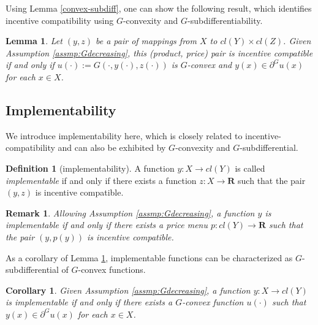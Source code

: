 \documentclass[a4paper, 11pt]{amsart}
\numberwithin{equation}{section}
\theoremstyle{plain}
\newtheorem{corollary}[theorem]{Corollary}
\newtheorem{lemma}[theorem]{Lemma}
\newtheorem{remark}[theorem]{Remark}
\theoremstyle{definition}
\newtheorem{definition}[theorem]{Definition}
\theoremstyle{remark}
\newcommand{\R}{\mathbf{R}}
\begin{document}
Using Lemma \ref{convex-subdiff}, one can show the following result, which identifies incentive compatibility using $G$-convexity and $G$-subdifferentiability.

\begin{lemma}\label{incen/convex}
	Let $(y,z)$ be a pair of mappings from $X$ to $cl(Y) \times cl(Z)$. Given Assumption \ref{assmp:Gdecreasing}, this (product, price) pair is incentive compatible %
	if and only if $u(\cdot):=G(\cdot,y(\cdot),z(\cdot))$ is $G$-convex and $y(x)\in \partial^G u(x)$ for each $x \in X$.
\end{lemma}


\subsection{Implementability}\label{subsection:implementability}
{We introduce implementability here, which is closely related to incentive-compatibility and can also be exhibited by $G$-convexity and $G$-subdifferential. %
	
	\begin{definition}[implementability]
		A function $y: X \longrightarrow cl(Y)$ is called \textit{implementable} if and only if there exists a function $z: X \longrightarrow \R$  such that the pair $(y, z)$ is incentive compatible.
	\end{definition}
	
	\begin{remark}\label{rmk:implementability}
		Allowing Assumption \ref{assmp:Gdecreasing}, a function $y$ is implementable if and only if there exists a price menu $p: cl(Y) \longrightarrow \R$ such that the pair $(y, p(y))$ is incentive compatible.
	\end{remark}
	
	
	As a corollary of Lemma \ref{incen/convex},  implementable functions can be characterized as $G$-subdifferential of $G$-convex functions. 
	
	
	\begin{corollary}\label{cor:implementable}
		Given Assumption \ref{assmp:Gdecreasing}, a function $y: X \longrightarrow cl(Y)$ is implementable if and only if there exists a $G$-convex function $u(\cdot)$ such that $y(x) \in \partial^G u(x)$ for each $x\in X$.
	\end{corollary}
}
\end{document}
